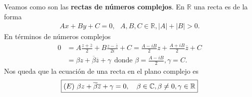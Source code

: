 Veamos como son las \textbf{rectas de números complejos}. En $\mathbb{R}$ una recta es de la forma
\begin{align*}
    Ax + By + C = 0, \ \ \ A,B,C \in \mathbb{R}, |A| + |B| > 0.
\end{align*}
En términos de números complejos
\begin{align*}
    0 & = A \frac{z + \overline{z}}{2} + B \frac{z - \overline{z}}{2i} + C = \frac{A - iB}{2}z + \frac{A +iB}{2}\overline{z} + C \\
      & = \beta z + \overline{\beta}\overline{z} + \gamma \ \ \text{donde } \beta = \frac{A - iB}{2}, \gamma = C.
\end{align*}
Nos queda que la ecuación de una recta en el plano complejo es
\begin{align*}
    \boxed{
        (E) \ \beta z + \overline{\beta}\overline{z} + \gamma = 0, \ \ \ \beta \in \com, \beta \not = 0, \gamma \in \mathbb{R}
    }
\end{align*}

